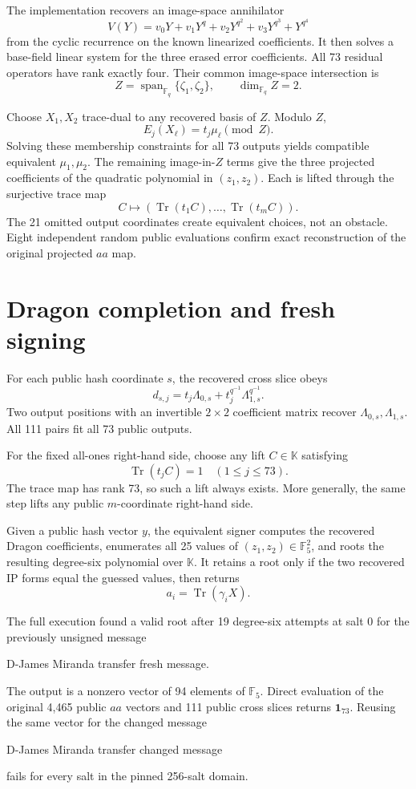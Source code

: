 \documentclass[10pt,a4paper]{article}
\newcommand{\F}{\mathbb{F}}
\newcommand{\K}{\mathbb{K}}
\newcommand{\Tr}{\operatorname{Tr}}
\newcommand{\Span}{\operatorname{span}}
\begin{document}
The implementation recovers an image-space annihilator
\[
 V(Y)=v_0Y+v_1Y^q+v_2Y^{q^2}+v_3Y^{q^3}+Y^{q^4}
\]
from the cyclic recurrence on the known linearized coefficients.  It then
solves a base-field linear system for the three erased error coefficients.
All 73 residual operators have rank exactly four.  Their common image-space
intersection is
\[
                 Z=\Span_{\F_q}\{\zeta_1,\zeta_2\},
                 \qquad \dim_{\F_q}Z=2.
\]

Choose $X_1,X_2$ trace-dual to any recovered basis of $Z$.  Modulo $Z$,
\[
                      E_j(X_\ell)=t_j\mu_\ell\pmod Z.
\]
Solving these membership constraints for all 73 outputs yields compatible
equivalent $\mu_1,\mu_2$.  The remaining image-in-$Z$ terms give the three
projected coefficients of the quadratic polynomial in $(z_1,z_2)$.  Each is
lifted through the surjective trace map
\[
 C\longmapsto (\Tr(t_1C),\ldots,\Tr(t_mC)).
\]
The 21 omitted output coordinates create equivalent choices, not an obstacle.
Eight independent random public evaluations confirm exact reconstruction of
the original projected $aa$ map.

\section{Dragon completion and fresh signing}

For each public hash coordinate $s$, the recovered cross slice obeys
\[
 d_{s,j}=t_j\Lambda_{0,s}+
         t_j^{q^{-1}}\Lambda_{1,s}^{q^{-1}}.
\]
Two output positions with an invertible $2\times2$ coefficient matrix recover
$\Lambda_{0,s},\Lambda_{1,s}$.  All 111 pairs fit all 73 public outputs.

For the fixed all-ones right-hand side, choose any lift $C\in\K$ satisfying
\[
                  \Tr(t_jC)=1\quad(1\le j\le73).
\]
The trace map has rank 73, so such a lift always exists.  More generally, the
same step lifts any public $m$-coordinate right-hand side.

Given a public hash vector $y$, the equivalent signer computes the recovered
Dragon coefficients, enumerates all 25 values of $(z_1,z_2)\in\F_5^2$, and
roots the resulting degree-six polynomial over $\K$.  It retains a root only
if the two recovered IP forms equal the guessed values, then returns
\[
                    a_i=\Tr(\gamma_iX).
\]

The full execution found a valid root after 19 degree-six attempts at salt 0
for the previously unsigned message
\begin{center}
\ttfamily D-James Miranda transfer fresh message.
\end{center}
The output is a nonzero vector of 94 elements of $\F_5$.  Direct evaluation
of the original 4,465 public $aa$ vectors and 111 public cross slices returns
$\boldsymbol{1}_{73}$.  Reusing the same vector for the changed message
\begin{center}
\ttfamily D-James Miranda transfer changed message
\end{center}
fails for every salt in the pinned 256-salt domain.
\end{document}
